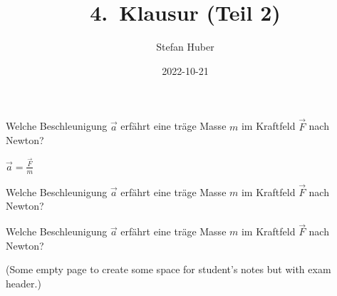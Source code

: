 \documentclass[ngerman,twoside,exam,showanswers]{exsheet2}
\title{4.\ Klausur (Teil 2)}
\date{2022-10-21}
\author{Stefan Huber}
\institute{Department IT}
\begin{document}
\maketitle


\begin{exercise}[6]
  Welche Beschleunigung $\vec{a}$ erfährt eine träge Masse $m$ im Kraftfeld
  $\vec{F}$ nach Newton?
  \vspace{2cm}
\end{exercise}


\begin{answer}
  $\vec{a} = \frac{\vec{F}}{m}$
\end{answer}


\begin{exercise}[3]
  Welche Beschleunigung $\vec{a}$ erfährt eine träge Masse $m$ im Kraftfeld
  $\vec{F}$ nach Newton?
  \vspace{2cm}
\end{exercise}


\begin{exercise}[1]
  Welche Beschleunigung $\vec{a}$ erfährt eine träge Masse $m$ im Kraftfeld
  $\vec{F}$ nach Newton?
  \vspace{2cm}
\end{exercise}


\newpage\null
(Some empty page to create some space for student's notes but with exam header.)
\newpage\null
\end{document}
